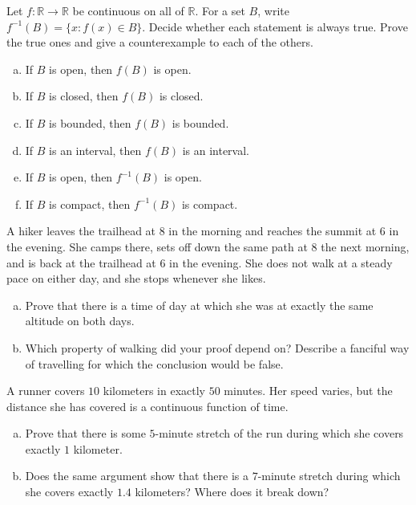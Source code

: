\begin{problem}
Let $f : \mathbb{R} \to \mathbb{R}$ be continuous on all of $\mathbb{R}$.  For a set $B$, write $f^{-1}(B) = \{x : f(x) \in B\}$.  Decide whether each statement is always true.  Prove the true ones and give a counterexample to each of the others.
\begin{enumerate}[(a)]
	\item If $B$ is open, then $f(B)$ is open.
	\item If $B$ is closed, then $f(B)$ is closed.
	\item If $B$ is bounded, then $f(B)$ is bounded.
	\item If $B$ is an interval, then $f(B)$ is an interval.
	\item If $B$ is open, then $f^{-1}(B)$ is open.
	\item If $B$ is compact, then $f^{-1}(B)$ is compact.
\end{enumerate}
\end{problem}

\begin{problem}
A hiker leaves the trailhead at 8 in the morning and reaches the summit at 6 in the evening.  She camps there, sets off down the same path at 8 the next morning, and is back at the trailhead at 6 in the evening.  She does not walk at a steady pace on either day, and she stops whenever she likes.
\begin{enumerate}[(a)]
	\item Prove that there is a time of day at which she was at exactly the same altitude on both days.
	\item Which property of walking did your proof depend on?  Describe a fanciful way of travelling for which the conclusion would be false.
\end{enumerate}
\end{problem}

\begin{problem}
A runner covers $10$ kilometers in exactly $50$ minutes.  Her speed varies, but the distance she has covered is a continuous function of time.
\begin{enumerate}[(a)]
	\item Prove that there is some $5$-minute stretch of the run during which she covers exactly $1$ kilometer.
	\item Does the same argument show that there is a $7$-minute stretch during which she covers exactly $1.4$ kilometers?  Where does it break down?
\end{enumerate}
\end{problem}

